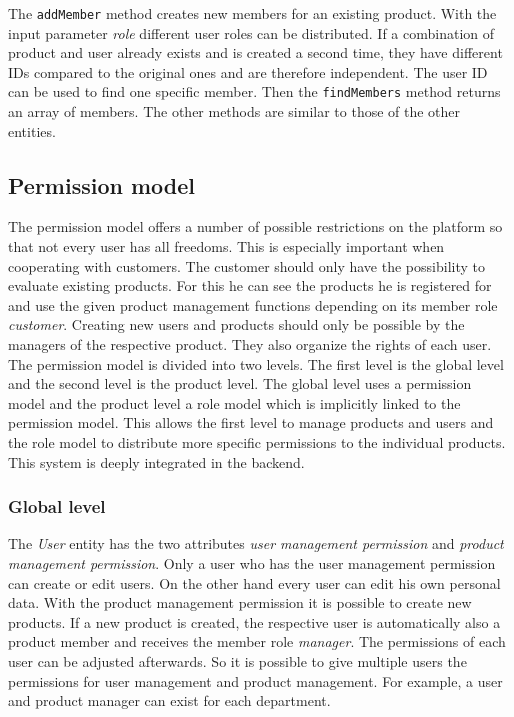     The \texttt{addMember} method creates new members for an existing product. With the input parameter \textit{role} different user roles can be distributed. If a combination of product and user already exists and is created a second time, they have different IDs compared to the original ones and are therefore independent. 
    The user ID can be used to find one specific member. Then the \texttt{findMembers} method returns an array of members. The other methods are similar to those of the other entities.

    \subsection*{Permission model}
    \label{subsec:permissionModel}
    The permission model offers a number of possible restrictions on the platform so that not every user has all freedoms. This is especially important when cooperating with customers. The customer should only have the possibility to evaluate existing products. For this he can see the products he is registered for and use the given product management functions depending on its member role \textit{customer}. Creating new users and products should only be possible by the managers of the respective product. They also organize the rights of each user. The permission model is divided into two levels. The first level is the global level and the second level is the product level. The global level uses a permission model and the product level a role model which is implicitly linked to the permission model. 
    This allows the first level to manage products and users and the role model to distribute more specific permissions to the individual products. This system is deeply integrated in the backend.

    \subsubsection*{Global level}
    The \textit{User} entity has the two attributes \textit{user management permission} and \textit{product management permission}. Only a user who has the user management permission can create or edit users. On the other hand every user can edit his own personal data. With the product management permission it is possible to create new products. If a new product is created, the respective user is automatically also a product member and receives the member role \textit{manager}. The permissions of each user can be adjusted afterwards. So it is possible to give multiple users the permissions for user management and product management. For example, a user and product manager can exist for each department. 


